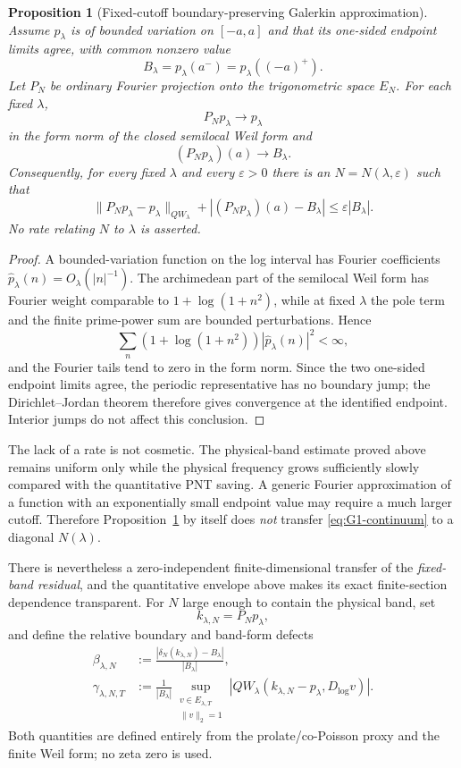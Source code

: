 \documentclass[11pt]{article}
\newtheorem{proposition}[theorem]{Proposition}
\theoremstyle{remark}
\begin{document}
\begin{proposition}[Fixed-cutoff boundary-preserving Galerkin approximation]\label{prop:boundary-galerkin}
Assume $p_\lambda$ is of bounded variation on $[-a,a]$ and that its one-sided endpoint limits agree, with common nonzero value
\[
 B_\lambda=p_\lambda(a^-)=p_\lambda((-a)^+).
\]
Let $P_N$ be ordinary Fourier projection onto the trigonometric space $E_N$.  For each fixed $\lambda$,
\[
 P_Np_\lambda\to p_\lambda
\]
in the form norm of the closed semilocal Weil form and
\[
 (P_Np_\lambda)(a)\to B_\lambda.
\]
Consequently, for every fixed $\lambda$ and every $\varepsilon>0$ there is an $N=N(\lambda,\varepsilon)$ such that
\[
 \|P_Np_\lambda-p_\lambda\|_{QW_\lambda}
 +|(P_Np_\lambda)(a)-B_\lambda|
 \le \varepsilon |B_\lambda|.
\]
No rate relating $N$ to $\lambda$ is asserted.
\end{proposition}
\begin{proof}
A bounded-variation function on the log interval has Fourier coefficients $\widehat p_\lambda(n)=O_\lambda(|n|^{-1})$.  The archimedean part of the semilocal Weil form has Fourier weight comparable to $1+\log(1+n^2)$, while at fixed $\lambda$ the pole term and the finite prime-power sum are bounded perturbations.  Hence
\[
 \sum_n(1+\log(1+n^2))|\widehat p_\lambda(n)|^2<\infty,
\]
and the Fourier tails tend to zero in the form norm.  Since the two one-sided endpoint limits agree, the periodic representative has no boundary jump; the Dirichlet--Jordan theorem therefore gives convergence at the identified endpoint.  Interior jumps do not affect this conclusion.
\end{proof}

The lack of a rate is not cosmetic.  The physical-band estimate proved above remains uniform only while the physical frequency grows sufficiently slowly compared with the quantitative PNT saving.  A generic Fourier approximation of a function with an exponentially small endpoint value may require a much larger cutoff.  Therefore Proposition~\ref{prop:boundary-galerkin} by itself does \emph{not} transfer \eqref{eq:G1-continuum} to a diagonal $N(\lambda)$.

There is nevertheless a zero-independent finite-dimensional transfer of the
\emph{fixed-band residual}, and the quantitative envelope above makes its exact
finite-section dependence transparent.  For $N$ large enough to contain the
physical band, set
\[
 k_{\lambda,N}=P_Np_\lambda,
\]
and define the relative boundary and band-form defects
\begin{align}
 \beta_{\lambda,N}
 &:=\frac{|\delta_N(k_{\lambda,N})-B_\lambda|}{|B_\lambda|},
 \label{eq:g1-beta}\\
 \gamma_{\lambda,N,T}
 &:=\frac1{|B_\lambda|}
 \sup_{\substack{v\in E_{\lambda,T}\\\|v\|_2=1}}
 |QW_\lambda(k_{\lambda,N}-p_\lambda,D_{\log}v)|.
 \label{eq:g1-gamma}
\end{align}
Both quantities are defined entirely from the prolate/co-Poisson proxy and the
finite Weil form; no zeta zero is used.
\end{document}
